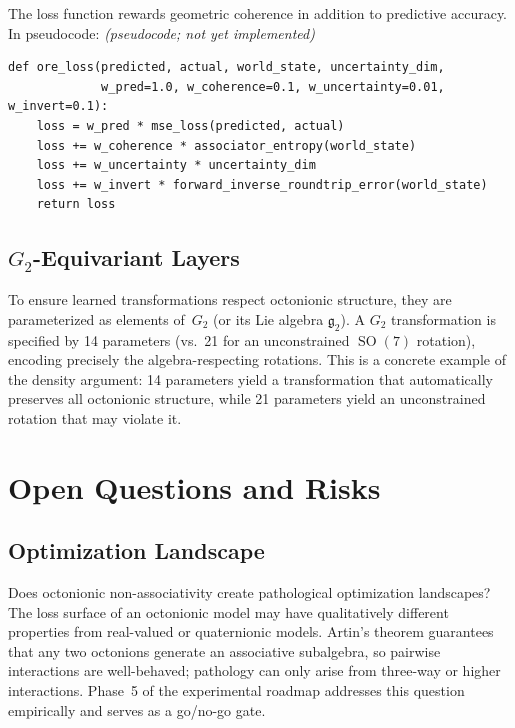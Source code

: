 \documentclass[11pt,a4paper]{article}
\DeclareMathOperator{\SO}{SO}
\newcommand{\pseudocodelabel}{\hfill\textit{(pseudocode; not yet implemented)}}
\begin{document}
The loss function rewards geometric coherence in addition to predictive accuracy. In pseudocode: \pseudocodelabel
\begin{lstlisting}[style=python, caption={ORE loss combining prediction accuracy with geometric regularization (pseudocode).}]
def ore_loss(predicted, actual, world_state, uncertainty_dim,
             w_pred=1.0, w_coherence=0.1, w_uncertainty=0.01, w_invert=0.1):
    loss = w_pred * mse_loss(predicted, actual)
    loss += w_coherence * associator_entropy(world_state)
    loss += w_uncertainty * uncertainty_dim
    loss += w_invert * forward_inverse_roundtrip_error(world_state)
    return loss
\end{lstlisting}

\subsection{\texorpdfstring{$G_2$}{G2}-Equivariant Layers}

To ensure learned transformations respect octonionic structure, they are parameterized as elements of~$G_2$ (or its Lie algebra $\mathfrak{g}_2$). A $G_2$ transformation is specified by 14 parameters (vs.\ 21 for an unconstrained $\SO(7)$ rotation), encoding precisely the algebra-respecting rotations. This is a concrete example of the density argument: 14 parameters yield a transformation that automatically preserves all octonionic structure, while 21 parameters yield an unconstrained rotation that may violate it.

\section{Open Questions and Risks}
\label{sec:risks}

\subsection{Optimization Landscape}

Does octonionic non-associativity create pathological optimization landscapes? The loss surface of an octonionic model may have qualitatively different properties from real-valued or quaternionic models. Artin's theorem guarantees that any two octonions generate an associative subalgebra, so pairwise interactions are well-behaved; pathology can only arise from three-way or higher interactions. Phase~5 of the experimental roadmap addresses this question empirically and serves as a go/no-go gate.
\end{document}
